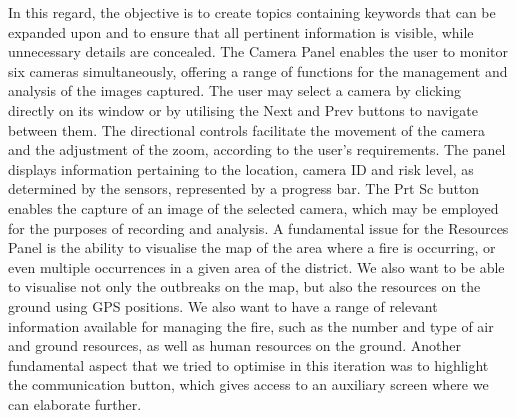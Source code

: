 In this regard, the objective is to create topics containing keywords that can be expanded upon and to ensure that all pertinent information is visible, while unnecessary details are concealed.
The Camera Panel enables the user to monitor six cameras simultaneously, offering a range of functions for the management and analysis of the images captured. The user may select a camera by clicking directly on its window or by utilising the Next and Prev buttons to navigate between them. The directional controls facilitate the movement of the camera and the adjustment of the zoom, according to the user's requirements.
The panel displays information pertaining to the location, camera ID and risk level, as determined by the sensors, represented by a progress bar. The Prt Sc button enables the capture of an image of the selected camera, which may be employed for the purposes of recording and analysis.
A fundamental issue for the Resources Panel is the ability to visualise the map of the area where a fire is occurring, or even multiple occurrences in a given area of the district. We also want to be able to visualise not only the outbreaks on the map, but also the resources on the ground using GPS positions. We also want to have a range of relevant information available for managing the fire, such as the number and type of air and ground resources, as well as human resources on the ground.
Another fundamental aspect that we tried to optimise in this iteration was to highlight the communication button, which gives access to an auxiliary screen where we can elaborate further.

